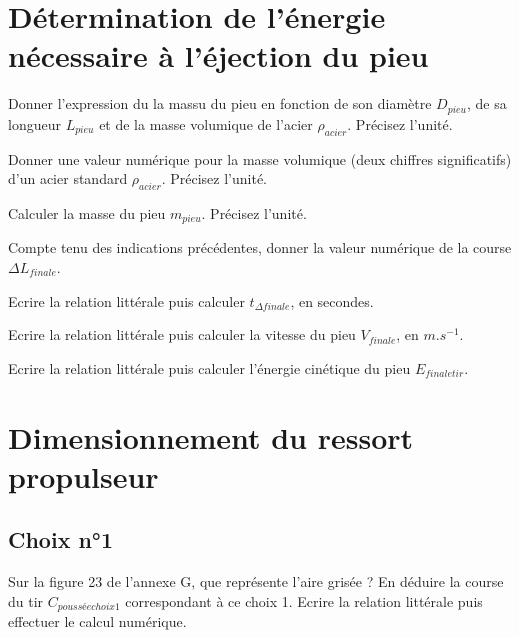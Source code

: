 \documentclass[11pt]{article}
\begin{document}
\section{Détermination de l'énergie nécessaire à l'éjection du pieu}

\UPSTIquestion* Donner l'expression du la massu du pieu en fonction de son diamètre $D_{pieu}$, de sa longueur $L_{pieu}$ et de la masse volumique de l'acier $\rho_{acier}$. Précisez l'unité. 
\begin{UPSTIcorrige}
\end{UPSTIcorrige}

\UPSTIquestion Donner une valeur numérique pour la masse volumique (deux chiffres significatifs) d'un acier standard $\rho_{acier}$. Précisez l'unité. 
\begin{UPSTIcorrige}
\end{UPSTIcorrige}

\UPSTIquestion Calculer la masse du pieu $m_{pieu}$. Précisez l'unité. 
\begin{UPSTIcorrige}
\end{UPSTIcorrige}


\UPSTIquestion Compte tenu des indications précédentes, donner la valeur numérique de la course $\Delta L_{finale}$. 
\begin{UPSTIcorrige}
\end{UPSTIcorrige}

\UPSTIquestion Ecrire la relation littérale puis calculer $t_{\Delta finale}$, en secondes.
\begin{UPSTIcorrige}
\end{UPSTIcorrige}

\UPSTIquestion Ecrire la relation littérale puis calculer la vitesse du pieu $V_{finale}$, en $\si{m.s^{-1}}$.
\begin{UPSTIcorrige}
\end{UPSTIcorrige}

\UPSTIquestion Ecrire la relation littérale puis calculer l'énergie cinétique du pieu $E_{finale tir}$. 
\begin{UPSTIcorrige}
\end{UPSTIcorrige}

\section{Dimensionnement du ressort propulseur}
\subsection*{Choix n°1}
\UPSTIquestion* Sur la figure 23 de l'annexe G, que représente l'aire grisée ?
En déduire la course du tir $C_{poussée choix 1}$ correspondant à ce choix 1. Ecrire la relation littérale puis effectuer le calcul numérique. 
\begin{UPSTIcorrige}
\end{UPSTIcorrige}
\end{document}

